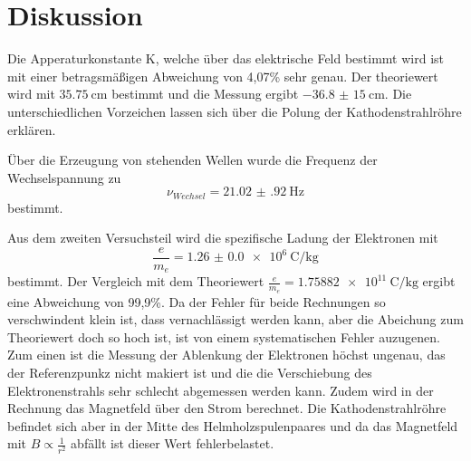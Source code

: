 \section{Diskussion}
\label{sec:Diskussion}
Die Apperaturkonstante K, welche über das elektrische Feld bestimmt wird ist mit einer
betragsmäßigen Abweichung von 4,07\% sehr genau. Der theoriewert wird mit
$\SI{35,75}{\cm}$ bestimmt und die Messung
ergibt $\SI{-36,8(15)}{\cm}$. Die unterschiedlichen Vorzeichen lassen sich über die
Polung der Kathodenstrahlröhre erklären.

Über die Erzeugung von stehenden Wellen wurde die Frequenz der Wechselspannung
zu
\begin{equation*}
  \nu_{Wechsel}=\SI{21.02(92)}{\Hz}
\end{equation*}
bestimmt.

Aus dem zweiten Versuchsteil wird die spezifische Ladung der Elektronen mit
\begin{equation*}
  \frac{e}{m_e}=\SI{1.26(0)e6}{\coulomb\per\kg}
\end{equation*}
bestimmt. Der Vergleich mit dem Theoriewert
$\frac{e}{m_e}=\SI{1,75882e11}{\coulomb\per\kg}$ \cite{em}
ergibt eine Abweichung von 99,9\%.
Da der Fehler für beide Rechnungen so verschwindent klein ist, dass vernachlässigt werden
kann, aber die Abeichung zum Theoriewert doch so hoch ist, ist von einem
systematischen Fehler auzugenen. Zum einen ist die Messung der Ablenkung der Elektronen
höchst ungenau, das der Referenzpunkz nicht makiert ist und die die Verschiebung des
Elektronenstrahls sehr schlecht abgemessen werden kann. Zudem wird in der Rechnung das Magnetfeld
über den Strom berechnet. Die Kathodenstrahlröhre befindet sich aber in der Mitte des
Helmholzspulenpaares und da das Magnetfeld mit $B\propto\frac{1}{r^{2}}$ abfällt
ist dieser Wert fehlerbelastet.
